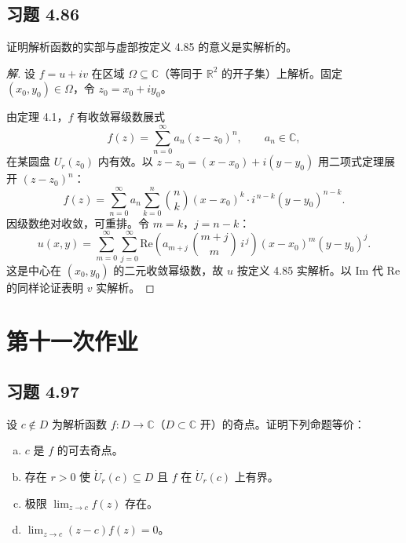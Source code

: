 \documentclass[11pt,a4paper]{article}
\newcommand{\R}{\mathbb{R}}
\newcommand{\C}{\mathbb{C}}
\renewcommand{\Re}{\mathrm{Re}}
\renewcommand{\Im}{\mathrm{Im}}
\theoremstyle{definition}
\newenvironment{solution}{\begin{proof}[解]}{\end{proof}}
\begin{document}
\subsection{习题 4.86}

证明解析函数的实部与虚部按定义 4.85 的意义是实解析的。

\begin{solution}
  设 $f = u + iv$ 在区域 $\Omega \subseteq \C$（等同于 $\R^2$ 的开子集）上解析。固定 $(x_0, y_0) \in \Omega$，令 $z_0 = x_0 + iy_0$。

  由定理 4.1，$f$ 有收敛幂级数展式
  \[
    f(z) = \sum_{n=0}^{\infty} a_n (z - z_0)^n,
    \qquad a_n \in \C,
  \]
  在某圆盘 $U_r(z_0)$ 内有效。以 $z - z_0 = (x - x_0) + i(y - y_0)$ 用二项式定理展开 $(z - z_0)^n$：
  \[
    f(z) = \sum_{n=0}^{\infty} a_n
    \sum_{k=0}^{n} \binom{n}{k}
    (x - x_0)^k \cdot i^{\,n-k}(y - y_0)^{n-k}.
  \]
  因级数绝对收敛，可重排。令 $m = k$，$j = n - k$：
  \[
    u(x,y) = \sum_{m=0}^{\infty} \sum_{j=0}^{\infty}
    \Re\!\left(a_{m+j}\,\binom{m+j}{m}\,i^{\,j}\right)
    (x - x_0)^m (y - y_0)^j.
  \]
  这是中心在 $(x_0, y_0)$ 的二元收敛幂级数，故 $u$ 按定义 4.85 实解析。以 $\Im$ 代 $\Re$ 的同样论证表明 $v$ 实解析。
\end{solution}

\section{第十一次作业}

\subsection{习题 4.97}

设 $c \notin D$ 为解析函数 $f : D \to \C$（$D \subset \C$ 开）的奇点。证明下列命题等价：
\begin{enumerate}[(a)]
  \item $c$ 是 $f$ 的可去奇点。
  \item 存在 $r > 0$ 使 $\dot{U}_r(c) \subseteq D$ 且 $f$ 在 $\dot{U}_r(c)$ 上有界。
  \item 极限 $\lim_{z \to c} f(z)$ 存在。
  \item $\lim_{z \to c} (z - c)f(z) = 0$。
\end{enumerate}
\end{document}
